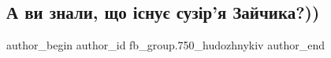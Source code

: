  
 
 
 
 

\subsection{А ви знали, що існує сузір'я Зайчика?))}
\label{sec:02_04_2018.fb.fb_group.750_hudozhnykiv.1.suzirja_zajchika}

\ifcmt
 author_begin
   author_id fb_group.750_hudozhnykiv
 author_end
\fi
